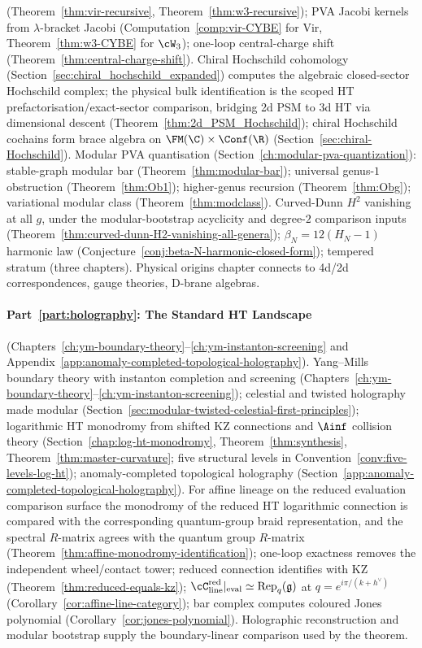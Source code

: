 (Theorem~\ref{thm:vir-recursive},
Theorem~\ref{thm:w3-recursive}); PVA Jacobi kernels from
$\lambda$-bracket Jacobi
(Computation~\ref{comp:vir-CYBE} for Vir,
Theorem~\ref{thm:w3-CYBE} for $\cW_3$); one-loop central-charge
shift (Theorem~\ref{thm:central-charge-shift}). Chiral Hochschild
cohomology (Section~\ref{sec:chiral_hochschild_expanded})
computes the algebraic closed-sector Hochschild complex; the physical
bulk identification is the scoped HT prefactorisation/exact-sector
comparison, bridging 2d PSM to 3d HT via dimensional descent
(Theorem~\ref{thm:2d_PSM_Hochschild}); chiral Hochschild
cochains form brace algebra on $\FM(\C) \times \Conf(\R)$
(Section~\ref{sec:chiral-Hochschild}). Modular PVA quantisation
(Section~\ref{ch:modular-pva-quantization}): stable-graph modular
bar (Theorem~\ref{thm:modular-bar}); universal genus-$1$
obstruction (Theorem~\ref{thm:Ob1}); higher-genus recursion
(Theorem~\ref{thm:Obg}); variational modular class
(Theorem~\ref{thm:modclass}). Curved-Dunn $H^2$ vanishing at all
$g$, under the modular-bootstrap acyclicity and degree-$2$
comparison inputs
(Theorem~\ref{thm:curved-dunn-H2-vanishing-all-genera});
$\beta_N = 12(H_N - 1)$ harmonic law
(Conjecture~\ref{conj:beta-N-harmonic-closed-form}); tempered
stratum (three chapters). Physical origins chapter connects to
4d/2d correspondences, gauge theories, D-brane algebras.

\paragraph{Part~\ref{part:holography}: The Standard HT Landscape}
(Chapters~\ref{ch:ym-boundary-theory}--\ref{ch:ym-instanton-screening}
and Appendix~\ref{app:anomaly-completed-topological-holography}).
Yang--Mills boundary theory with instanton completion and
screening (Chapters~\ref{ch:ym-boundary-theory}--\ref{ch:ym-instanton-screening});
celestial and twisted holography made modular
(Section~\ref{sec:modular-twisted-celestial-first-principles});
logarithmic HT monodromy from shifted KZ connections and $\Ainf$
collision theory (Section~\ref{chap:log-ht-monodromy},
Theorem~\ref{thm:synthesis}, Theorem~\ref{thm:master-curvature};
five structural levels in
Convention~\ref{conv:five-levels-log-ht});
anomaly-completed topological holography
(Section~\ref{app:anomaly-completed-topological-holography}).
For affine lineage on the reduced evaluation comparison surface
the monodromy of the reduced HT logarithmic connection is
compared with the corresponding quantum-group braid
representation, and the spectral $R$-matrix agrees with the
quantum group $R$-matrix
\textup{(}Theorem~\textup{\ref{thm:affine-monodromy-identification}}\textup{)};
one-loop exactness removes the independent wheel/contact tower; reduced
connection identifies with KZ
(Theorem~\ref{thm:reduced-equals-kz});
$\cC_{\mathrm{line}}^{\mathrm{red}}|_{\mathrm{eval}} \simeq
\mathrm{Rep}_q(\fg)$ at $q = e^{i\pi/(k+h^\vee)}$
(Corollary~\ref{cor:affine-line-category}); bar complex computes
coloured Jones polynomial
(Corollary~\ref{cor:jones-polynomial}). Holographic
reconstruction and modular bootstrap supply the boundary-linear
comparison used by the theorem.


